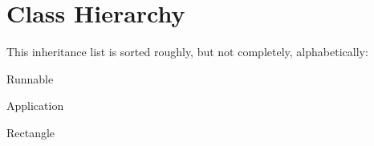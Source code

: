 \section{Class Hierarchy}
This inheritance list is sorted roughly, but not completely, alphabetically\+:\begin{DoxyCompactList}
\item {}
\item {}
\item Runnable\begin{DoxyCompactList}
\item {}
\end{DoxyCompactList}
\item Application\begin{DoxyCompactList}
\item {}
\end{DoxyCompactList}
\item Rectangle\begin{DoxyCompactList}
\item {}
\end{DoxyCompactList}
\end{DoxyCompactList}

